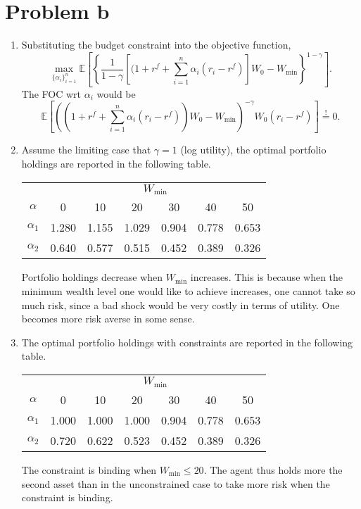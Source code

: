 \section*{Problem b}
\begin{enumerate}
\item
Substituting the budget constraint into the objective function,
\begin{equation}
	\max_{\{\alpha_i\}_{i=1}^n}\mathbb 
		E\left[\left\{\frac{1}{1-\gamma}\left[(1+r^f+\sum^n_{i=1}\alpha_i(r_i-r^f)\right]W_0-W_{\min}\right\}^{1-\gamma}\right].
\end{equation}
The FOC wrt $\alpha_i$ would be
\begin{equation}
	\mathbb E\left[\left((1+r^f+\sum^n_{i=1}\alpha_i(r_i-r^f))W_0-W_{\min}\right)^{-\gamma}W_0(r_i-r^f)\right]\overset{!}{=}0.
\end{equation}

\item
Assume the limiting case that $\gamma=1$ (log utility), the optimal portfolio holdings are reported in the following table.\\
    \begin{center}
        \begin{tabular}{ccccccc}
        	\toprule \toprule
        	 & 	\multicolumn{6}{c}{$W_{\min}$}	\\
        	\cmidrule(lr){2-7} 
        	$\alpha$ & 	0 & 	10 & 	20 & 	30 & 	40 & 	50\\
        	\midrule
        	$\alpha_1$ & 	1.280 & 	1.155 & 	1.029 & 	0.904 & 	0.778 & 	0.653\\
        	$\alpha_2$ & 	0.640 & 	0.577 & 	0.515 & 	0.452 & 	0.389 & 	0.326\\
        	\bottomrule
        \end{tabular}
    \end{center}
Portfolio holdings decrease when $W_{\min}$ increases. This is because when the minimum wealth level one would like to achieve increases, one cannot take so much risk, since a bad shock would be very costly in terms of utility. One becomes more risk averse in some sense.

\item
The optimal portfolio holdings with constraints are reported in the following table.\\
    \begin{center}
        \begin{tabular}{ccccccc}
        	\toprule \toprule
        	 & 	\multicolumn{6}{c}{$W_{\min}$}	\\
        	\cmidrule(lr){2-7} 
        	$\alpha$ & 	0 & 	10 & 	20 & 	30 & 	40 & 	50\\
        	\midrule
        	$\alpha_1$ & 	1.000 & 	1.000 & 	1.000 & 	0.904 & 	0.778 & 	0.653\\
			$\alpha_2$ & 	0.720 & 	0.622 & 	0.523 & 	0.452 & 	0.389 & 	0.326\\
        	\bottomrule
        \end{tabular}
    \end{center}
The constraint is binding when $W_{\min}\le20$. The agent thus holds more the second asset than in the unconstrained case to take more risk when the constraint is binding.

\end{enumerate}

